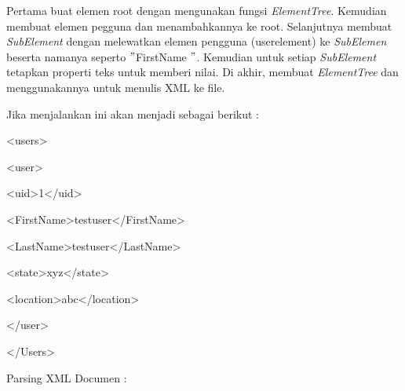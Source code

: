 \vspace{10pt}
\noindent 
 \hspace*{0.5in} Pertama buat elemen root dengan mengunakan fungsi \textit{ElementTree}. Kemudian membuat elemen pegguna dan menambahkannya ke root. Selanjutnya membuat \textit{SubElement }dengan melewatkan elemen pengguna (userelement) ke \textit{SubElemen} beserta namanya seperto  $ " $FirstName $ " $. Kemudian untuk setiap \textit{SubElement} tetapkan properti teks untuk memberi nilai. Di akhir, membuat \textit{ElementTree} dan menggunakannya untuk menulis XML ke file. \par
\noindent 
 \hspace*{0.5in} Jika menjalankan ini akan menjadi sebagai berikut : \par
\noindent 
 {\fontsize{10pt}{10pt}\selectfont <users>} \par
\noindent 
{\fontsize{10pt}{10pt}\selectfont  \hspace*{0.5in} <user>} \par
\noindent 
{\fontsize{10pt}{10pt}\selectfont  \hspace*{0.5in}  \hspace*{0.5in} <uid>1</uid>} \par
\noindent 
{\fontsize{10pt}{10pt}\selectfont  \hspace*{0.5in}  \hspace*{0.5in} <FirstName>testuser</FirstName>} \par
\noindent 
{\fontsize{10pt}{10pt}\selectfont  \hspace*{0.5in}  \hspace*{0.5in} <LastName>testuser</LastName>} \par
\noindent 
{\fontsize{10pt}{10pt}\selectfont  \hspace*{0.5in}  \hspace*{0.5in} <state>xyz</state>} \par
\noindent 
{\fontsize{10pt}{10pt}\selectfont  \hspace*{0.5in}  \hspace*{0.5in} <location>abc</location>} \par
\noindent 
{\fontsize{10pt}{10pt}\selectfont  \hspace*{0.5in} </user>} \par
\noindent 
{\fontsize{10pt}{10pt}\selectfont </Users>} \par
\vspace{10pt}
\noindent 
Parsing XML Documen : \par
\vspace{12pt}
